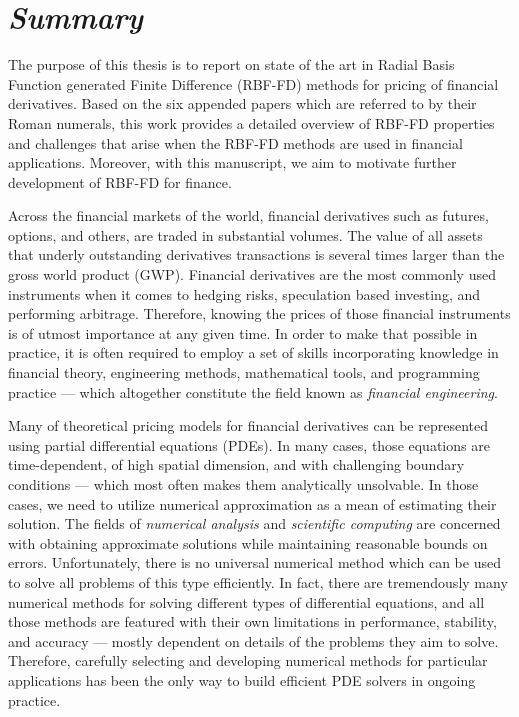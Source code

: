 \documentclass{UUThesisTemplate}
\begin{document}
\chapter*{{{\sffamily\emph{Summary}}}}
{\noteunic

\par
The purpose of this thesis is to report on state of the art in Radial Basis Function generated Finite Difference (RBF-FD) methods for pricing of financial derivatives. Based on the six appended papers which are referred to by their Roman numerals, this work provides a detailed overview of RBF-FD properties and challenges that arise when the RBF-FD methods are used in financial applications. Moreover, with this manuscript, we aim to motivate further development of RBF-FD for finance.

\par
Across the financial markets of the world, financial derivatives such as futures, options, and others, are traded in substantial volumes. The value of all assets that underly outstanding derivatives transactions is several times larger than the gross world product (GWP). Financial derivatives are the most commonly used instruments when it comes to hedging risks, speculation based investing, and performing arbitrage. Therefore, knowing the prices of those financial instruments is of utmost importance at any given time. In order to make that possible in practice, it is often required to employ a set of skills incorporating knowledge in financial theory, engineering methods, mathematical tools, and programming practice --- which altogether constitute the field known as \emph{financial engineering}. 

\par
Many of theoretical pricing models for financial derivatives can be represented using partial differential equations (PDEs). In many cases, those equations are time-dependent, of high spatial dimension, and with challenging boundary conditions --- which most often makes them analytically unsolvable. In those cases, we need to utilize numerical approximation as a mean of estimating their solution. The fields of \emph{numerical analysis} and \emph{scientific computing} are concerned with obtaining approximate solutions while maintaining reasonable bounds on errors. Unfortunately, there is no universal numerical method which can be used to solve all problems of this type efficiently. In fact, there are tremendously many numerical methods for solving different types of differential equations, and all those methods are featured with their own limitations in performance, stability, and accuracy --- mostly dependent on details of the problems they aim to solve. Therefore, carefully selecting and developing numerical methods for particular applications has been the only way to build efficient PDE solvers in ongoing practice. 

}
\end{document}
